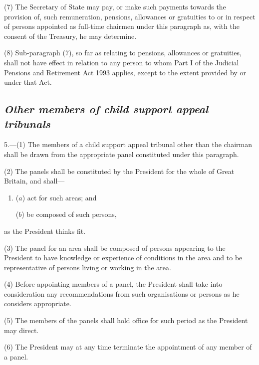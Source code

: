 \documentclass[12pt,a4paper]{article}
\begin{document}
(7) The Secretary of State may pay, or make such payments towards the provision of, such remuneration, pensions, allowances or gratuities to or in respect of persons appointed as full-time chairmen under this paragraph as, with the consent of the Treasury, he may determine.

(8) Sub-paragraph (7), so far as relating to pensions, allowances or gratuities, shall not have effect in relation to any person to whom Part I of the Judicial Pensions and Retirement Act 1993 applies, except to the extent provided by or under that Act.


\subsection*{\itshape Other members of child support appeal tribunals}

5.---(1) The members of a child support appeal tribunal other than the chairman shall be drawn from the appropriate panel constituted under this paragraph.

(2) The panels shall be constituted by the President for the whole of Great Britain, and shall—
\begin{enumerate}\item[]
($a$) act for such areas; and

($b$) be composed of such persons,
\end{enumerate}
as the President thinks fit.

(3) The panel for an area shall be composed of persons appearing to the President to have knowledge or experience of conditions in the area and to be representative of persons living or working in the area.

(4) Before appointing members of a panel, the President shall take into consideration any recommendations from such organisations or persons as he considers appropriate.

(5) The members of the panels shall hold office for such period as the President may direct.

(6) The President may at any time terminate the appointment of any member of a panel.
\end{document}

